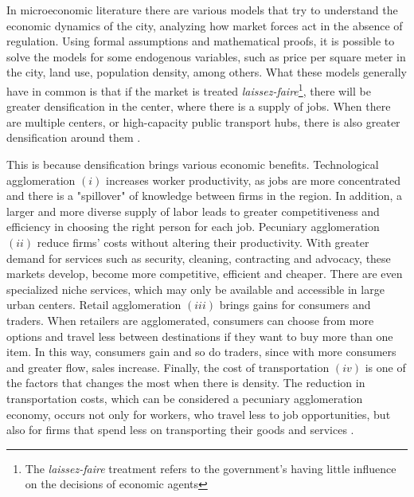 In microeconomic literature there are various models that try to understand the economic dynamics of the city, analyzing how market forces act in the absence of regulation. Using formal assumptions and mathematical proofs, it is possible to solve the models for some endogenous variables, such as price per square meter in the city, land use, population density, among others. What these models generally have in common is that if the market is treated \textit{laissez-faire}\footnote{The \textit{laissez-faire} treatment refers to the government's having little influence on the decisions of economic agents}, there will be greater densification in the center, where there is a supply of jobs. When there are multiple centers, or high-capacity public transport hubs, there is also greater densification around them \cite{papageorgiou2012essay, fujita1989urban}.


This is because densification brings various economic benefits. Technological agglomeration $(i)$ increases worker productivity, as jobs are more concentrated and there is a "spillover" of knowledge between firms in the region. In addition, a larger and more diverse supply of labor leads to greater competitiveness and efficiency in choosing the right person for each job. Pecuniary agglomeration $(ii)$ reduce firms' costs without altering their productivity. With greater demand for services such as security, cleaning, contracting and advocacy, these markets develop, become more competitive, efficient and cheaper. There are even specialized niche services, which may only be available and accessible in large urban centers. Retail agglomeration $(iii)$ brings gains for consumers and traders. When retailers are agglomerated, consumers can choose from more options and travel less between destinations if they want to buy more than one item. In this way, consumers gain and so do traders, since with more consumers and greater flow, sales increase. Finally, the cost of transportation $(iv)$ is one of the factors that changes the most when there is density. The reduction in transportation costs, which can be considered a pecuniary agglomeration economy, occurs not only for workers, who travel less to job opportunities, but also for firms that spend less on transporting their goods and services \cite{brueckner2011lectures}.

